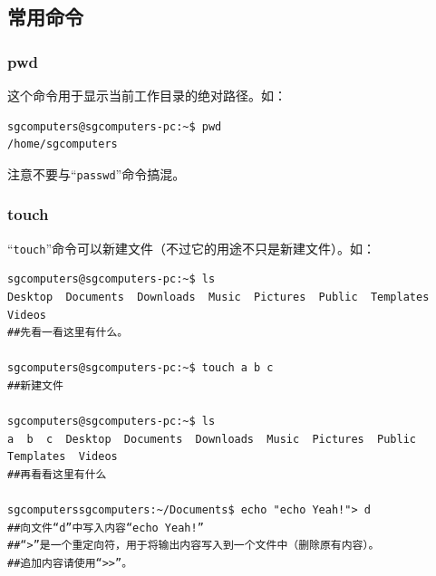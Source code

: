 \subsection{常用命令}
\subsubsection{pwd}
这个命令用于显示当前工作目录的绝对路径。如：
\begin{verbatim}
sgcomputers@sgcomputers-pc:~$ pwd
/home/sgcomputers
\end{verbatim} \par
注意不要与“\verb|passwd|”命令搞混。
\subsubsection{touch}
\label{sec:nf}“\verb|touch|”命令可以新建文件（不过它的用途不只是新建文件）。如：
\begin{verbatim}
sgcomputers@sgcomputers-pc:~$ ls
Desktop  Documents  Downloads  Music  Pictures  Public  Templates  Videos
##先看一看这里有什么。

sgcomputers@sgcomputers-pc:~$ touch a b c
##新建文件

sgcomputers@sgcomputers-pc:~$ ls
a  b  c  Desktop  Documents  Downloads  Music  Pictures  Public  Templates  Videos
##再看看这里有什么

sgcomputerssgcomputers:~/Documents$ echo "echo Yeah!"> d
##向文件“d”中写入内容“echo Yeah!”
##“>”是一个重定向符，用于将输出内容写入到一个文件中（删除原有内容）。
##追加内容请使用“>>”。
\end{verbatim}
